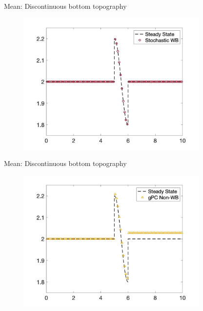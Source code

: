 \documentclass[
    pdf,
    11pt,
    xcolor={svgnames},
  ]{beamer}
\begin{document}
\begin{frame}{Mean: Discontinuous bottom topography}
    \begin{figure}
    \centering
    \includegraphics[width=0.85\textwidth]{./Figures/burgers_dis_wb_mean}
    \end{figure}
\end{frame}
\begin{frame}{Mean: Discontinuous bottom topography}
    \begin{figure}
    \centering
    \includegraphics[width=0.85\textwidth]{./Figures/burgers_dis_non_mean}
    \end{figure}
\end{frame}
\end{document}
